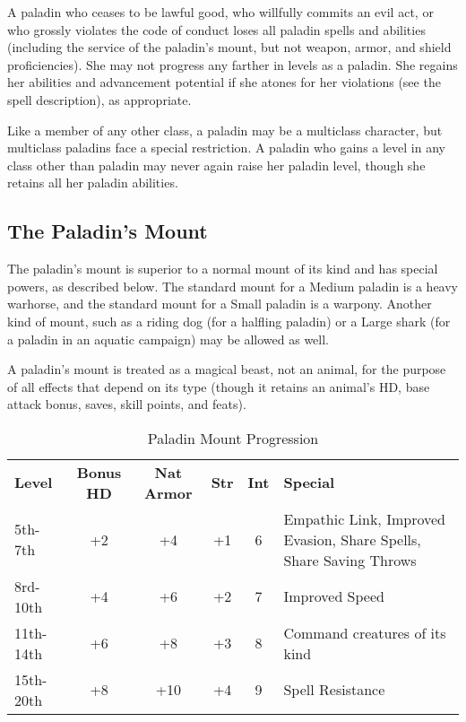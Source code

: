 A paladin who ceases to be lawful good, who willfully commits an evil act, or who 
grossly violates the code of conduct loses all paladin spells and abilities (including 
the service of the paladin's mount, but not weapon, armor, and shield proficiencies). 
She may not progress any farther in levels as a paladin. She regains her abilities 
and advancement potential if she atones for her violations (see the  spell description), as appropriate.

Like a member of any other class, a paladin may be a multiclass character, but 
multiclass paladins face a special restriction. A paladin who gains a level in 
any class other than paladin may never again raise her paladin level, though she 
retains all her paladin abilities.

\subsection{The Paladin's Mount}

The paladin's mount is superior to a normal mount of its kind and has special powers, 
as described below. The standard mount for a Medium paladin is a heavy warhorse, 
and the standard mount for a Small paladin is a warpony. Another kind of mount, 
such as a riding dog (for a halfling paladin) or a Large shark (for a paladin in 
an aquatic campaign) may be allowed as well.

A paladin's mount is treated as a magical beast, not an animal, for the purpose 
of all effects that depend on its type (though it retains an animal's HD, base 
attack bonus, saves, skill points, and feats).

\begin{table}[htb]
\caption{Paladin Mount Progression}
\centering
\begin{tabular}{l c c c c p{5cm}}
\textbf{Level} & \textbf{Bonus HD} & \textbf{Nat Armor} & \textbf{Str} & \textbf{Int} & \textbf{Special}\\
5th-7th & +2 & +4 & +1 & 6 & Empathic Link, Improved Evasion, Share Spells, Share Saving Throws\\
8rd-10th & +4 & +6 & +2 & 7 & Improved Speed\\
11th-14th & +6 & +8 & +3 & 8 & Command creatures of its kind\\
15th-20th & +8 & +10 & +4 & 9 & Spell Resistance\\
\end{tabular}
\end{table}

